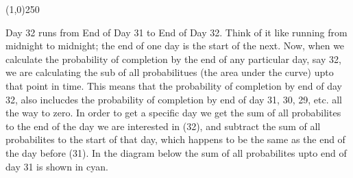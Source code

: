 \begin{center}\line(1,0){250}\end{center}
Day 32 runs from End of Day 31 to End of Day 32.  Think of it like running from midnight to midnight; the end of one day is the start of the next.  Now, when we calculate the probability of completion by the end of any particular day, say 32, we are calculating the sub of all probabilitues (the area under the curve) upto that point in time.  This means that the probability of completion by end of day 32, also inclucdes the probability of completion by end of day 31, 30, 29, etc. all the way to zero.  In order to get a specific day we get the sum of all probabilites to the end of the day we are interested in (32), and subtract the sum of all probabilites to the start of that day, which happens to be the same as the end of the day before (31).  In the diagram below the sum of all probabilites upto end of day 31 is shown in cyan.


